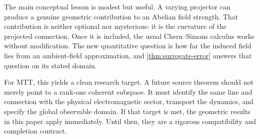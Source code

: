 \documentclass[11pt]{article}
\begin{document}
The main conceptual lesson is modest but useful.  A varying projector can
produce a genuine geometric contribution to an Abelian field strength.  That
contribution is neither optional nor mysterious: it is the curvature of the
projected connection.  Once it is included, the usual Chern--Simons calculus
works without modification.  The new quantitative question is how far the
induced field lies from an ambient-field approximation, and
\cref{thm:surrogate-error} answers that question on its stated domain.

For MTT, this yields a clean research target.  A future source theorem should
not merely point to a rank-one coherent subspace.  It must identify the same
line and connection with the physical electromagnetic sector, transport the
dynamics, and specify the global observable domain.  If that target is met,
the geometric results in this paper apply immediately.  Until then, they are a
rigorous compatibility and completion contract.



\end{document}
